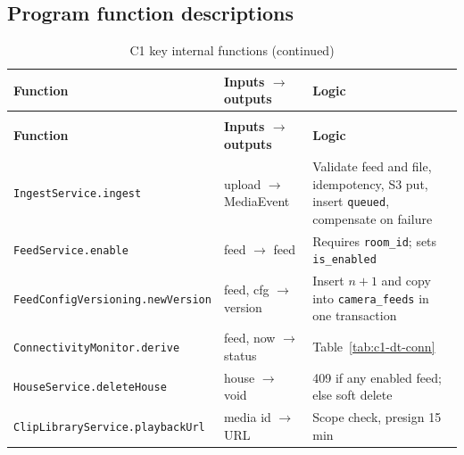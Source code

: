 \subsection{Program function descriptions}
\begin{longtable}{L{4.0cm}L{3.8cm}L{6.8cm}}
\caption{C1 key internal functions}\label{tab:c1-fn}\\
\toprule
\textbf{Function} & \textbf{Inputs $\rightarrow$ outputs} & \textbf{Logic} \\
\midrule
\endfirsthead
\caption[]{C1 key internal functions (continued)}\\
\toprule
\textbf{Function} & \textbf{Inputs $\rightarrow$ outputs} & \textbf{Logic} \\
\midrule
\endhead
\texttt{IngestService.\allowbreak ingest} & upload $\rightarrow$ MediaEvent & Validate feed and file, idempotency, S3 put, insert \texttt{queued}, compensate on failure \\
\texttt{FeedService.\allowbreak enable} & feed $\rightarrow$ feed & Requires \texttt{room\_id}; sets \texttt{is\_enabled} \\
\texttt{FeedConfigVersioning.\allowbreak newVersion} & feed, cfg $\rightarrow$ version & Insert $n+1$ and copy into \texttt{camera\_feeds} in one transaction \\
\texttt{ConnectivityMonitor.\allowbreak derive} & feed, now $\rightarrow$ status & Table~\ref{tab:c1-dt-conn} \\
\texttt{HouseService.\allowbreak deleteHouse} & house $\rightarrow$ void & 409 if any enabled feed; else soft delete \\
\texttt{ClipLibraryService.\allowbreak playbackUrl} & media id $\rightarrow$ URL & Scope check, presign 15 min \\
\bottomrule
\end{longtable}


